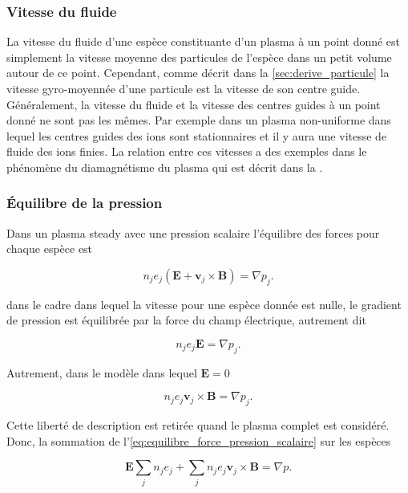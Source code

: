 \documentclass[main.tex]{subfiles}
\begin{document}
\subsubsection*{Vitesse du fluide}

La vitesse du fluide d'une espèce constituante d'un plasma à un point donné est simplement la vitesse moyenne des particules de l'espèce dans un petit volume autour de ce point.
Cependant, comme décrit dans la \autoref{sec:derive_particule} la vitesse gyro-moyennée d'une particule est la vitesse de son centre guide.
Généralement, la vitesse du fluide et la vitesse des centres guides à un point donné ne sont pas les mêmes.
Par exemple dans un plasma non-uniforme dans lequel les centres guides des ions sont stationnaires et il y aura une vitesse de fluide des ions finies.
La relation entre ces vitesses a des exemples dans le phénomène du diamagnétisme du plasma qui est décrit dans la \color{red}{Section 2.22 (lien à rajouter quand elle sera faite)}\color{black}.

\subsubsection*{Équilibre de la pression}

Dans un plasma steady avec une pression scalaire l'équilibre des forces pour chaque espèce est

\begin{equation}
	n_j e_j \left( \bm{E} + \bm{v}_j \times \bm{B} \right) = \nabla p_j.
	\label{eq:equilibre_force_pression_scalaire}
\end{equation}

\noindent dans le cadre dans lequel la vitesse pour une espèce donnée est nulle, le gradient de pression est équilibrée par la force du champ électrique, autrement dit

\[
	n_j e_j \bm{E} = \nabla p_j.
\]

\noindent Autrement, dans le modèle dans lequel \( \bm{E} = 0 \)

\[
	n_j e_j \bm{v}_j \times \bm{B} = \nabla p_j.
\]

\noindent Cette liberté de description est retirée quand le plasma complet est considéré.
Donc, la sommation de l'\autoref{eq:equilibre_force_pression_scalaire} sur les espèces

\begin{equation}
	\bm{E} \sum_j n_j e_j + \sum_j n_j e_j \bm{v}_j \times \bm{B} = \nabla p.
	\label{eq:equilibre_force_sommation}
\end{equation}
\end{document}
